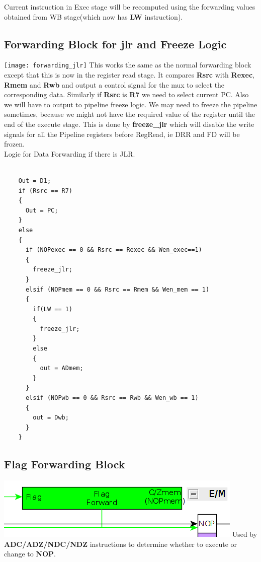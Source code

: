 \documentclass{article}
\begin{document}
Current instruction in Exec stage will be recomputed using the forwarding values
obtained from WB stage(which now has \textbf{LW} instruction).
\subsection*{Forwarding Block for jlr and Freeze Logic}

\texttt{[image: forwarding\_jlr]}
This works the same as the normal forwarding block except that this is now in the register read stage. It compares
\textbf{Rsrc} with \textbf{Rexec}, \textbf{Rmem} and \textbf{Rwb} and output a control signal for the mux to select
the corresponding data. Similarly if \textbf{Rsrc} is \textbf{R7} we need to select current PC. Also we will have
to output to pipeline freeze logic. We may need to freeze the pipeline sometimes, because we might not have the
required value of the register until the end of the execute stage. This is done by \textbf{freeze\_jlr} which will
disable the write signals for all the Pipeline registers before RegRead, ie DRR and FD will be frozen.
\\ Logic for Data Forwarding if there is JLR.
\begin{lstlisting}

    Out = D1;
    if (Rsrc == R7)
    {
      Out = PC;
    }
    else
    {
      if (NOPexec == 0 && Rsrc == Rexec && Wen_exec==1)
      {
        freeze_jlr;
      }
      elsif (NOPmem == 0 && Rsrc == Rmem && Wen_mem == 1)
      {
        if(LW == 1)
        {
          freeze_jlr;
        }
        else
        {
          out = ADmem;
        }
      }
      elsif (NOPwb == 0 && Rsrc == Rwb && Wen_wb == 1)
      {
        out = Dwb;
      }
    }
    \end{lstlisting}

\subsection*{Flag Forwarding Block}

\includegraphics{flag_forward}
Used by \textbf{ADC/ADZ/NDC/NDZ} instructions to determine whether to execute
or change to \textbf{NOP}.
\end{document}
